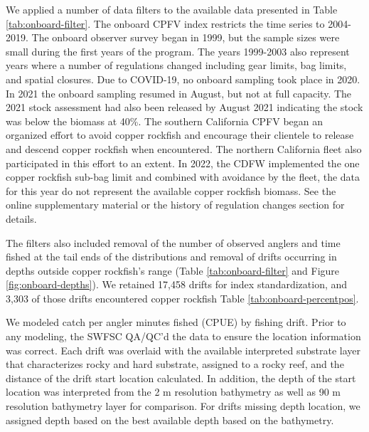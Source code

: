 \documentclass[11pt,
  english,
  letterpaper,
]{article}
\begin{document}
We applied a number of data filters to the available data presented in Table \ref{tab:onboard-filter}. The onboard CPFV index restricts the time series to 2004-2019. The onboard observer survey began in 1999, but the sample sizes were small during the first years of the program. The years 1999-2003 also represent years where a number of regulations changed including gear limits, bag limits, and spatial closures. Due to COVID-19, no onboard sampling took place in 2020. In 2021 the onboard sampling resumed in August, but not at full capacity. The 2021 stock assessment had also been released by August 2021 indicating the stock was below the biomass at 40\%. The southern California CPFV began an organized effort to avoid copper rockfish and encourage their clientele to release and descend copper rockfish when encountered. The northern California fleet also participated in this effort to an extent. In 2022, the CDFW implemented the one copper rockfish sub-bag limit and combined with avoidance by the fleet, the data for this year do not represent the available copper rockfish biomass. See the online supplementary material or the history of regulation changes section for details.

The filters also included removal of the number of observed anglers and time fished at the tail ends of the distributions and removal of drifts occurring in depths outside copper rockfish's range (Table \ref{tab:onboard-filter} and Figure \ref{fig:onboard-depths}). We retained 17,458 drifts for index standardization, and 3,303 of those drifts encountered copper rockfish Table \ref{tab:onboard-percentpos}.

We modeled catch per angler minutes fished (CPUE) by fishing drift. Prior to any modeling, the SWFSC QA/QC'd the data to ensure the location information was correct. Each drift was overlaid with the available interpreted substrate layer that characterizes rocky and hard substrate, assigned to a rocky reef, and the distance of the drift start location calculated. In addition, the depth of the start location was interpreted from the 2 m resolution bathymetry as well as 90 m resolution bathymetry layer for comparison. For drifts missing depth location, we assigned depth based on the best available depth based on the bathymetry.
\end{document}

